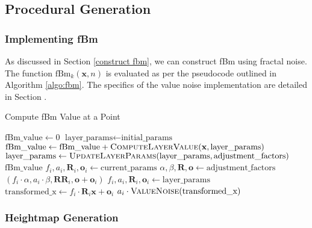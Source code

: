 \subsection{Procedural Generation}

\subsubsection{Implementing fBm}
\label{Implement fbm}

As discussed in Section \ref{construct fbm}, we can construct fBm using fractal noise. The function $\text{fBm}_k(\mathbf{x}, n)$ is evaluated as per the pseudocode outlined in Algorithm \ref{algo:fbm}. The specifics of the value noise implementation are detailed in Section .

\begin{algorithm}
\caption{Compute fBm Value at a Point}
\label{algo:fbm}
\begin{algorithmic}[1]
    \State $\text{fBm\_value} \gets 0$
    \State $\text{layer\_params} \gets \text{initial\_params}$
        \State $\text{fBm\_value} \gets \text{fBm\_value} + \Call{ComputeLayerValue}{\mathbf{x}, \text{layer\_params}}$
        \State $\text{layer\_params} \gets \Call{UpdateLayerParams}{\text{layer\_params}, \text{adjustment\_factors}}$
    \EndFor
    \State \Return $\text{fBm\_value}$
\EndFunction
\Statex
{}
    \State $f_i, a_i, \mathbf{R}_i, \mathbf{o}_i \gets \text{current\_params}$
    \State $\alpha, \beta, \mathbf{R}, \mathbf{o} \gets \text{adjustment\_factors}$
    \State \Return $(f_i \cdot \alpha, a_i \cdot \beta, \mathbf{R} \mathbf{R}_i, \mathbf{o} + \mathbf{o}_i)$
\EndFunction
\Statex
{}
    \State $f_i, a_i, \mathbf{R}_i, \mathbf{o}_i \gets \text{layer\_params}$
    \State $\text{transformed\_x} \gets f_i \cdot \mathbf{R}_i \textbf{x} + \mathbf{o}_i$
    \State \Return $a_i \cdot \Call{ValueNoise}{\text{transformed\_x}}$
\EndFunction
\end{algorithmic}
\end{algorithm}

\subsubsection{Heightmap Generation}

